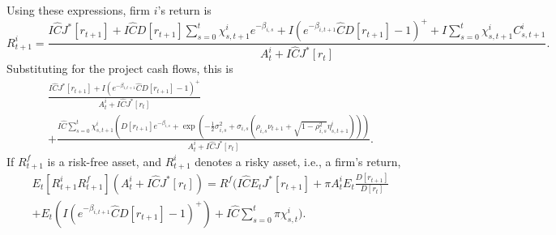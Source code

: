 Using these expressions, firm $i$'s return is  
\[
R_{t+1}^i = \frac{I \hat C J^*[r_{t+1}] + I \hat C D[r_{t+1}] \sum_{s = 0}^{t} \chi_{s, t+1}^i e^{- \beta_{i, s}} + I( e^{- \beta_{i, t+1}} \hat C D[r_{t+1}] - 1)^+ +  I \sum_{s = 0}^t \chi_{s, t+1}^i C_{s, t+1}^i}{A_t^i + I \hat C J^*[r_t]}.
\]
Substituting for the project cash flows, this is 
\begin{multline*}
\frac{I \hat C J^*[r_{t+1}]+  I( e^{- \beta_{i, t+1}} \hat C D[r_{t+1}] - 1)^+ }{A_t^i + I \hat C J^*[r_t]}\\
+ \frac{ I \hat C \sum_{s = 0}^t \chi_{s, t+1}^i  (D[r_{t+1}] e^{- \beta_{i, s}} + \exp( - \frac{1}{2}\sigma_{i, s}^2 +  \sigma_{i, s} (\rho_{i, s} \nu_{t+1} + \sqrt{1 - \rho_{i, s}^2} \eta_{s, t+1}^i)))}{A_t^i + I \hat C J^*[r_t]}.
\end{multline*}
If $R_{t+1}^f$ is a risk-free asset, and $R_{t+1}^i$ denotes a risky asset, i.e., a firm's return,
\begin{multline*}
E_t[R_{t+1}^i  R_{t+1}^f] (A_t^i + I \hat C J^*[r_t]) = R^f( I \hat C E_t J^*[r_{t+1}] + \pi A_t^i E_t \frac{D[r_{t+1}]}{D[r_t]}\\+ E_t( I ( e^{- \beta_{i, t+1}} \hat C D[r_{t+1}] - 1)^+) + I \hat C \sum_{s =0}^t \pi\chi_{s, t}^i).
\end{multline*}

